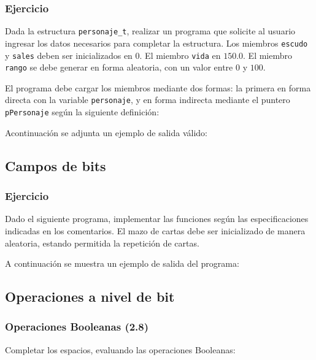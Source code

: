 \subsubsection{Ejercicio}
Dada la estructura  \texttt{personaje\_t}, realizar un programa que solicite al usuario ingresar los datos necesarios para completar la estructura.
Los miembros \texttt{escudo} y \texttt{sales} deben ser inicializados en 0. 
El miembro \texttt{vida} en $150.0$.
El miembro \texttt{rango} se debe generar en forma aleatoria, con un valor entre $0$ y $100$.
\lstset{inputencoding=utf8/latin1}

El programa debe cargar los miembros mediante dos formas: la primera en forma directa con la variable \texttt{personaje}, y en forma indirecta mediante el puntero \texttt{pPersonaje} según la siguiente definición:

\lstset{inputencoding=utf8/latin1}

Acontinuación se adjunta un ejemplo de salida válido:
\lstset{inputencoding=utf8/latin1}
{\small

}

\subsection*{Campos de bits}
\subsubsection{Ejercicio}
Dado el siguiente programa, implementar las funciones según las especificaciones indicadas en los comentarios.
El mazo de cartas debe ser inicializado de manera aleatoria, estando permitida la repetición de cartas.
\lstset{inputencoding=utf8/latin1}

\pagebreak
A continuación se muestra un ejemplo de salida del programa:
\lstset{inputencoding=utf8/latin1}
{\small

}

\subsection*{Operaciones a nivel de bit}
\subsubsection{ Operaciones Booleanas (2.8)}
Completar los espacios, evaluando las operaciones Booleanas:\\

